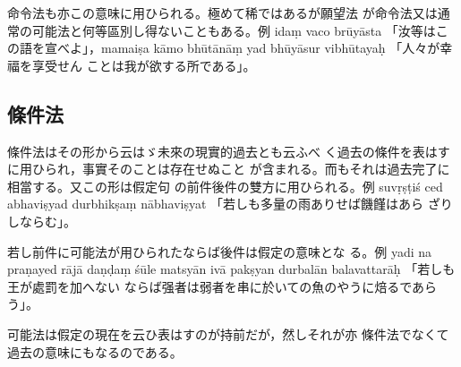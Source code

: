 命令法も亦この意味に用ひられる。極めて稀ではあるが願望法
が命令法又は通常の可能法と何等區別し得ないこともある。例
idaṃ vaco brūyāsta 「汝等はこの語を宣べよ」，mamaiṣa kāmo
bhūtānāṃ yad bhūyāsur vibhūtayaḥ 「人々が幸福を享受せん
ことは我が欲する所である」。

\subsection{條件法}
\numberParagraph
條件法はその形から云はゞ未來の現實的過去とも云ふべ
く過去の條件を表はすに用ひられ，事實そのことは存在せぬこと
が含まれる。而もそれは過去完了に相當する。又この形は假定句
の前件後件の雙方に用ひられる。例 suvṛṣṭiś ced abhaviṣyad
durbhikṣaṃ nābhaviṣyat 「若しも多量の雨ありせば饑饉はあら
ざりしならむ」。

若し前件に可能法が用ひられたならば後件は假定の意味とな
る。例 yadi na praṇayed rājā daṇḍaṃ śūle matsyān ivā\-%
pakṣyan durbalān balavattarāḥ 「若しも王が處罰を加へない
ならば强者は弱者を串に於いての魚のやうに焙るであらう」。

可能法は假定の現在を云ひ表はすのが持前だが，然しそれが亦
條件法でなくて過去の意味にもなるのである。

